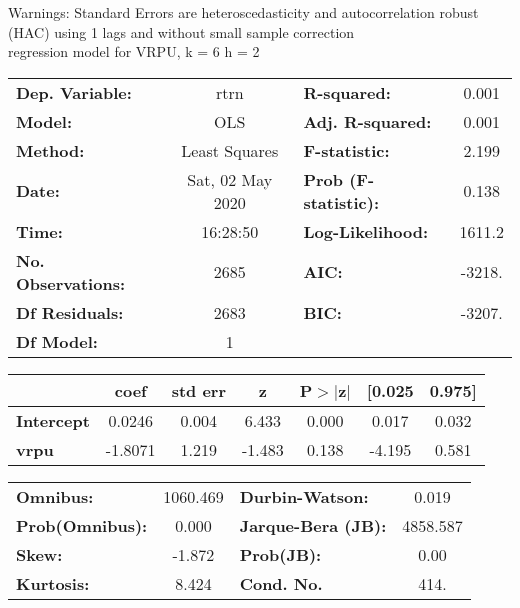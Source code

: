 Warnings: \newline
 [1] Standard Errors are heteroscedasticity and autocorrelation robust (HAC) using 1 lags and without small sample correction\\ 

regression model for VRPU, k = 6 h = 2\begin{center}
\begin{tabular}{lclc}
\toprule
\textbf{Dep. Variable:}    &       rtrn       & \textbf{  R-squared:         } &     0.001   \\
\textbf{Model:}            &       OLS        & \textbf{  Adj. R-squared:    } &     0.001   \\
\textbf{Method:}           &  Least Squares   & \textbf{  F-statistic:       } &     2.199   \\
\textbf{Date:}             & Sat, 02 May 2020 & \textbf{  Prob (F-statistic):} &    0.138    \\
\textbf{Time:}             &     16:28:50     & \textbf{  Log-Likelihood:    } &    1611.2   \\
\textbf{No. Observations:} &        2685      & \textbf{  AIC:               } &    -3218.   \\
\textbf{Df Residuals:}     &        2683      & \textbf{  BIC:               } &    -3207.   \\
\textbf{Df Model:}         &           1      & \textbf{                     } &             \\
\bottomrule
\end{tabular}
\begin{tabular}{lcccccc}
                   & \textbf{coef} & \textbf{std err} & \textbf{z} & \textbf{P$> |$z$|$} & \textbf{[0.025} & \textbf{0.975]}  \\
\midrule
\textbf{Intercept} &       0.0246  &        0.004     &     6.433  &         0.000        &        0.017    &        0.032     \\
\textbf{vrpu}      &      -1.8071  &        1.219     &    -1.483  &         0.138        &       -4.195    &        0.581     \\
\bottomrule
\end{tabular}
\begin{tabular}{lclc}
\textbf{Omnibus:}       & 1060.469 & \textbf{  Durbin-Watson:     } &    0.019  \\
\textbf{Prob(Omnibus):} &   0.000  & \textbf{  Jarque-Bera (JB):  } & 4858.587  \\
\textbf{Skew:}          &  -1.872  & \textbf{  Prob(JB):          } &     0.00  \\
\textbf{Kurtosis:}      &   8.424  & \textbf{  Cond. No.          } &     414.  \\
\bottomrule
\end{tabular}
\end{center}

